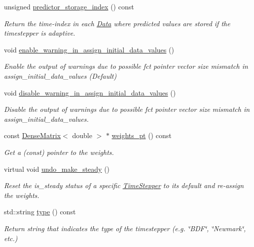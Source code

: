 \begin{DoxyCompactItemize}
unsigned \hyperlink{classoomph_1_1TimeStepper_a31e756a339277e21f74b21a5d61c9841}{predictor\+\_\+storage\+\_\+index} () const
\begin{DoxyCompactList}\small\item\em Return the time-\/index in each \hyperlink{classoomph_1_1Data}{Data} where predicted values are stored if the timestepper is adaptive. \end{DoxyCompactList}\item 
void \hyperlink{classoomph_1_1TimeStepper_a365cc834ec75291eba462f671ec997e1}{enable\+\_\+warning\+\_\+in\+\_\+assign\+\_\+initial\+\_\+data\+\_\+values} ()
\begin{DoxyCompactList}\small\item\em Enable the output of warnings due to possible fct pointer vector size mismatch in assign\+\_\+initial\+\_\+data\+\_\+values (Default) \end{DoxyCompactList}\item 
void \hyperlink{classoomph_1_1TimeStepper_a7f97ab9e4d8d4269cf75bf79b72da5bc}{disable\+\_\+warning\+\_\+in\+\_\+assign\+\_\+initial\+\_\+data\+\_\+values} ()
\begin{DoxyCompactList}\small\item\em Disable the output of warnings due to possible fct pointer vector size mismatch in assign\+\_\+initial\+\_\+data\+\_\+values. \end{DoxyCompactList}\item 
const \hyperlink{classoomph_1_1DenseMatrix}{Dense\+Matrix}$<$ double $>$ $\ast$ \hyperlink{classoomph_1_1TimeStepper_ac70698873c23a3a5963c76fecf9ed678}{weights\+\_\+pt} () const
\begin{DoxyCompactList}\small\item\em Get a (const) pointer to the weights. \end{DoxyCompactList}\item 
virtual void \hyperlink{classoomph_1_1TimeStepper_aada05f89e86aae352bd5b32bfb173b18}{undo\+\_\+make\+\_\+steady} ()
\begin{DoxyCompactList}\small\item\em Reset the is\+\_\+steady status of a specific \hyperlink{classoomph_1_1TimeStepper}{Time\+Stepper} to its default and re-\/assign the weights. \end{DoxyCompactList}\item 
std\+::string \hyperlink{classoomph_1_1TimeStepper_acbd69b35e54efa29b219bbb56ba49260}{type} () const
\begin{DoxyCompactList}\small\item\em Return string that indicates the type of the timestepper (e.\+g. \char`\"{}\+B\+D\+F\char`\"{}, \char`\"{}\+Newmark\char`\"{}, etc.) \end{DoxyCompactList}\item 

\end{DoxyCompactItemize}
